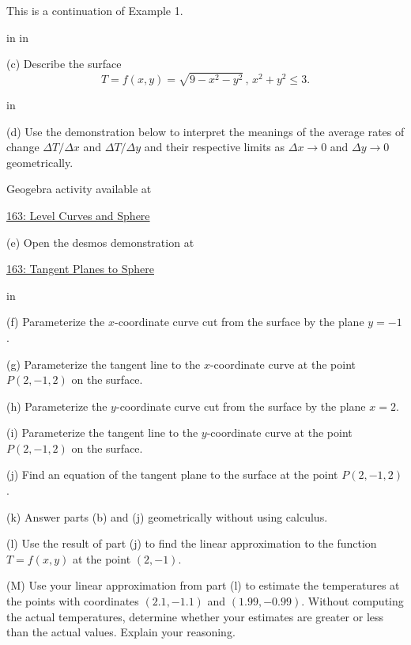 \documentclass{ximera}
\newcommand{\pskip}{\vskip 0.1 in}
\begin{document}
\begin{example}  \label{Esdtr435r}
This is a continuation of Example 1. 

\pskip \pskip

(c) Describe the surface
\[
  T = f(x,y) = \sqrt{9-x^2-y^2} \, , \, x^2 + y^2 \leq 3 .
\]

\pskip

(d) Use the demonstration below to interpret the meanings of the average rates of change $\Delta T/\Delta x$ and $\Delta T/\Delta y$ and their respective limits as $\Delta x\to 0$ and $\Delta y\to 0$ geometrically.

 
\begin{onlineOnly}
    \begin{center}
\end{center}
\end{onlineOnly}

Geogebra activity available at

\href{https://www.geogebra.org/classic/egnkjkqw}{163: Level Curves and Sphere}




(e) Open the desmos demonstration at

\href{https://www.desmos.com/3d/967c10cbdc}{163: Tangent Planes to Sphere}

\pskip

(f) Parameterize the $x$-coordinate curve cut from the surface by the plane $y=-1$.

(g) Parameterize the tangent line to the $x$-coordinate curve at the point $P(2,-1,2)$ on the surface.

(h) Parameterize the $y$-coordinate curve cut from the surface by the plane $x=2$.

(i) Parameterize the tangent line to the $y$-coordinate curve at the point $P(2,-1,2)$ on the surface.

(j) Find an equation of the tangent plane to the surface at the point $P(2,-1,2)$.

(k) Answer parts (b) and (j) geometrically without using calculus.

(l) Use the result of part (j) to find the linear approximation to the function $T=f(x,y)$ at the point $(2,-1)$.

(M) Use your linear approximation from part (l) to estimate the temperatures at the points with coordinates $(2.1, -1.1)$ and $(1.99, -0.99)$. Without computing the actual temperatures, determine whether your estimates are greater or less than the actual values. Explain your reasoning.

\end{example}
\end{document}
